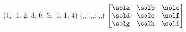 \MATRIXCOPY(1, -1, 2;
            3,  0, 5;
           -1,  1, 4)%
          (\sola,\solb,\solc;
           \sold,\sole,\solf;
           \solg,\solh,\soli)
$\begin{bmatrix}
       \sola & \solb & \solc \\
       \sold & \sole & \solf \\
       \solg & \solh & \soli
     \end{bmatrix}$
